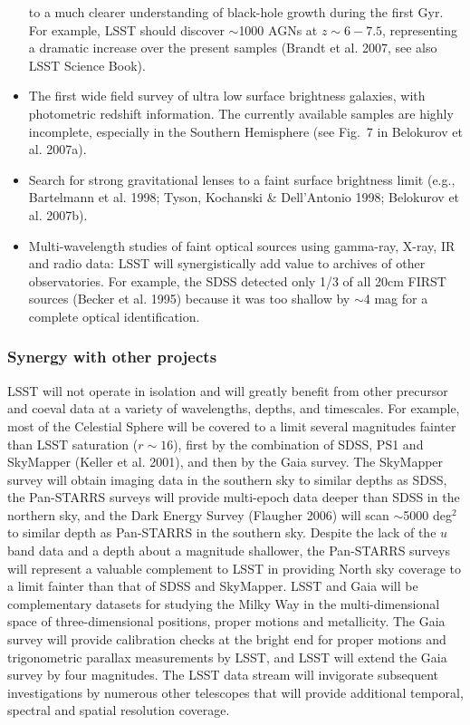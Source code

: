 \documentclass{emulateapj}
\newcommand{\B}[1]{{#1}}
\begin{document}
\begin{itemize}
      to a much clearer understanding of black-hole growth during the first Gyr. For
      example, LSST should discover $\sim$1000 AGNs at $z\sim6-7.5$,
      representing a dramatic increase over the present samples 
      (Brandt et al. 2007, see also LSST Science Book).
\item The first wide field survey of ultra low surface brightness galaxies, with 
      photometric redshift information. The currently available samples are highly
      incomplete, especially in the Southern Hemisphere (see Fig.~7 in Belokurov et al. 2007a). 
\item Search for strong gravitational lenses to a faint surface brightness limit (e.g., 
      Bartelmann et al. 1998; Tyson, Kochanski \& Dell'Antonio 1998; Belokurov et al. 2007b).
\item Multi-wavelength studies of faint optical sources using gamma-ray, X-ray, IR and
      radio data: \B{LSST will synergistically add value to archives of other observatories.}
      For example, the SDSS detected only 1/3 of all 20cm FIRST sources 
      (Becker et al. 1995) because it was too shallow by $\sim$4 mag for a complete 
      optical identification. 
\end{itemize}


\subsubsection{  Synergy with other projects }

LSST will not operate in isolation and will greatly benefit from other precursor and coeval 
data at a variety of wavelengths, depths, and timescales. For example, most of the Celestial 
Sphere will be covered to a limit several magnitudes fainter than LSST saturation 
($r\sim16$), first by the combination of SDSS, PS1 and SkyMapper (Keller et al. 2001), 
and then by the Gaia survey. The SkyMapper survey will obtain imaging data in the southern
sky to similar depths as SDSS, the Pan-STARRS surveys will provide multi-epoch data deeper 
than SDSS in the northern sky, and the Dark Energy Survey (Flaugher 2006) will scan 
$\sim$5000 deg$^2$ to similar depth as Pan-STARRS in the southern sky. Despite the lack of 
the $u$ band data and a depth about a magnitude shallower, the Pan-STARRS surveys
will represent a valuable complement to LSST in providing North sky coverage to a limit 
fainter than that of SDSS and SkyMapper. LSST and Gaia will 
be complementary datasets for studying the Milky Way in the multi-dimensional space of 
three-dimensional positions, proper motions and 
metallicity. The Gaia survey will provide calibration checks at the bright end for proper 
motions and trigonometric parallax measurements by LSST, and LSST will extend the 
Gaia survey by four magnitudes. The LSST data stream will invigorate subsequent 
investigations by numerous other telescopes that will provide 
additional temporal, spectral and spatial resolution coverage. 
\end{document}

